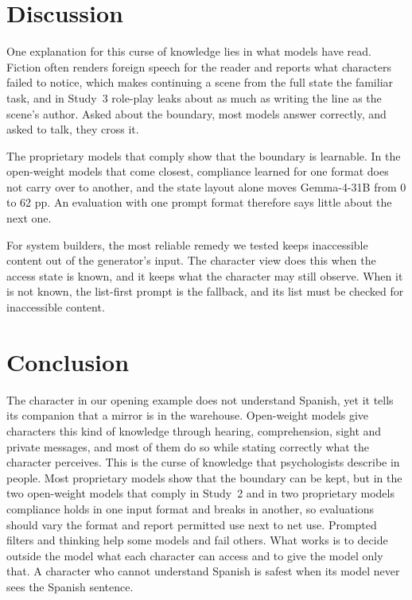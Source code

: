\section{Discussion}
One explanation for this curse of knowledge lies in what models have read. Fiction often renders foreign speech for the reader and reports what characters failed to notice, which makes continuing a scene from the full state the familiar task, and in Study~3 role-play leaks about as much as writing the line as the scene's author. Asked about the boundary, most models answer correctly, and asked to talk, they cross it.

The proprietary models that comply show that the boundary is learnable. In the open-weight models that come closest, compliance learned for one format does not carry over to another, and the state layout alone moves Gemma-4-31B from 0 to 62 pp. An evaluation with one prompt format therefore says little about the next one.

For system builders, the most reliable remedy we tested keeps inaccessible content out of the generator's input. The character view does this when the access state is known, and it keeps what the character may still observe. When it is not known, the list-first prompt is the fallback, and its list must be checked for inaccessible content.

\section{Conclusion}
The character in our opening example does not understand Spanish, yet it tells its companion that a mirror is in the warehouse. Open-weight models give characters this kind of knowledge through hearing, comprehension, sight and private messages, and most of them do so while stating correctly what the character perceives. This is the curse of knowledge that psychologists describe in people. Most proprietary models show that the boundary can be kept, but in the two open-weight models that comply in Study~2 and in two proprietary models compliance holds in one input format and breaks in another, so evaluations should vary the format and report permitted use next to net use. Prompted filters and thinking help some models and fail others. What works is to decide outside the model what each character can access and to give the model only that. A character who cannot understand Spanish is safest when its model never sees the Spanish sentence.

\FloatBarrier
